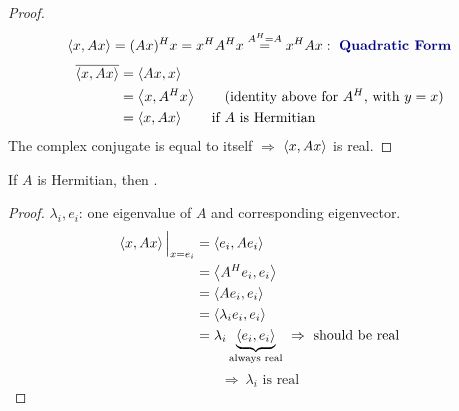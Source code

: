 \begin{proof}[Proof]
\[
\inner{x}{Ax}=(Ax)\Hm x=x\Hm A\Hm x\overset{A\Hm=A}{=}x\Hm Ax:\ \text{\term{Quadratic Form}}
\]
\begin{align*}
\overline{\left\langle x, Ax \right\rangle}&=\left\langle Ax, x \right\rangle\\
&=\left\langle x, A^{H} x \right\rangle\qquad\text{(identity above for $A^{H}$, with $y=x$)}\\
&=\left\langle x, Ax \right\rangle\qquad\text{if $A$ is Hermitian}
\end{align*}
The complex conjugate is equal to itself $\Rightarrow$ $\left\langle x, Ax \right\rangle$ is real.
\end{proof}

\begin{theorem}
\leavevmode{}If $A$ is Hermitian, then .
\end{theorem}
\begin{proof}[Proof]
$\lambda_i, e_i$: one eigenvalue of $A$ and corresponding eigenvector.
\begin{align*}
\inner{x}{Ax}\Big|_{x=e_i}&=\inner{e_i}{Ae_i}\\
&=\inner{A\Hm e_i}{e_i}\\
&=\inner{Ae_i}{e_i}\\
&=\inner{\lambda_ie_i}{e_i}\\
&=\lambda_i\underbrace{\inner{e_i}{e_i}}_{\text{always real}}\ \Rightarrow\ \text{should be real}
\end{align*}
\[
\Rightarrow\ \boxed{\lambda_i\text{ is real}}
\]
\end{proof}

